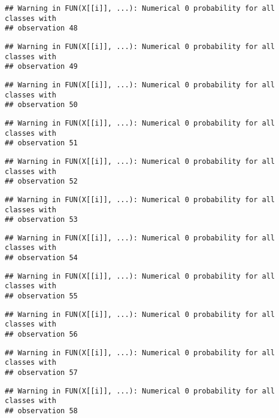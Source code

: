 \documentclass[
]{article}
\begin{document}
\begin{verbatim}
## Warning in FUN(X[[i]], ...): Numerical 0 probability for all classes with
## observation 48
\end{verbatim}

\begin{verbatim}
## Warning in FUN(X[[i]], ...): Numerical 0 probability for all classes with
## observation 49
\end{verbatim}

\begin{verbatim}
## Warning in FUN(X[[i]], ...): Numerical 0 probability for all classes with
## observation 50
\end{verbatim}

\begin{verbatim}
## Warning in FUN(X[[i]], ...): Numerical 0 probability for all classes with
## observation 51
\end{verbatim}

\begin{verbatim}
## Warning in FUN(X[[i]], ...): Numerical 0 probability for all classes with
## observation 52
\end{verbatim}

\begin{verbatim}
## Warning in FUN(X[[i]], ...): Numerical 0 probability for all classes with
## observation 53
\end{verbatim}

\begin{verbatim}
## Warning in FUN(X[[i]], ...): Numerical 0 probability for all classes with
## observation 54
\end{verbatim}

\begin{verbatim}
## Warning in FUN(X[[i]], ...): Numerical 0 probability for all classes with
## observation 55
\end{verbatim}

\begin{verbatim}
## Warning in FUN(X[[i]], ...): Numerical 0 probability for all classes with
## observation 56
\end{verbatim}

\begin{verbatim}
## Warning in FUN(X[[i]], ...): Numerical 0 probability for all classes with
## observation 57
\end{verbatim}

\begin{verbatim}
## Warning in FUN(X[[i]], ...): Numerical 0 probability for all classes with
## observation 58
\end{verbatim}
\end{document}
